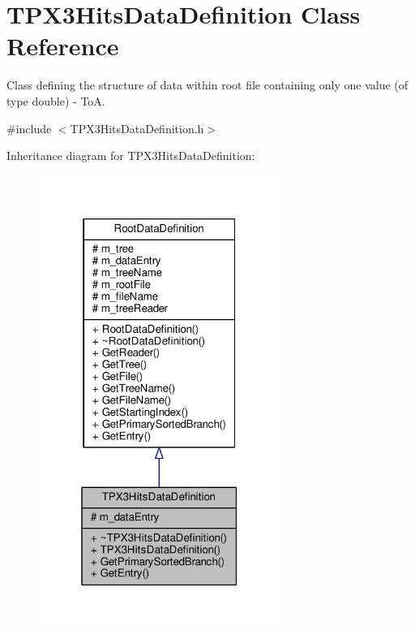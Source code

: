 \hypertarget{classTPX3HitsDataDefinition}{\section{T\+P\+X3\+Hits\+Data\+Definition Class Reference}
\label{classTPX3HitsDataDefinition}
}


Class defining the structure of data within root file containing only one value (of type double) -\/ To\+A.  




{\ttfamily \#include $<$T\+P\+X3\+Hits\+Data\+Definition.\+h$>$}



Inheritance diagram for T\+P\+X3\+Hits\+Data\+Definition\+:\nopagebreak
\begin{figure}[H]
\begin{center}
\leavevmode
\includegraphics[width=223pt]{classTPX3HitsDataDefinition__inherit__graph}
\end{center}
\end{figure}


